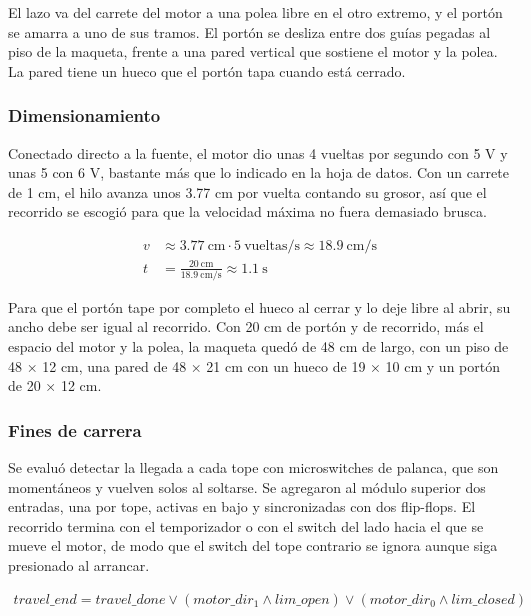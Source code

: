 \documentclass[11pt,letterpaper]{article}
\begin{document}
El lazo va del carrete del motor a una polea libre en el otro extremo, y el portón se amarra a uno de sus tramos. El portón se desliza entre dos guías pegadas al piso de la maqueta, frente a una pared vertical que sostiene el motor y la polea. La pared tiene un hueco que el portón tapa cuando está cerrado.

\subsubsection*{Dimensionamiento}

Conectado directo a la fuente, el motor dio unas 4 vueltas por segundo con 5 V y unas 5 con 6 V, bastante más que lo indicado en la hoja de datos. Con un carrete de 1 cm, el hilo avanza unos 3.77 cm por vuelta contando su grosor, así que el recorrido se escogió para que la velocidad máxima no fuera demasiado brusca.

\begin{align*}
v &\approx 3.77\ \text{cm} \cdot 5\ \text{vueltas/s} \approx 18.9\ \text{cm/s} \\
t &= \frac{20\ \text{cm}}{18.9\ \text{cm/s}} \approx 1.1\ \text{s}
\end{align*}

Para que el portón tape por completo el hueco al cerrar y lo deje libre al abrir, su ancho debe ser igual al recorrido. Con 20 cm de portón y de recorrido, más el espacio del motor y la polea, la maqueta quedó de 48 cm de largo, con un piso de 48 × 12 cm, una pared de 48 × 21 cm con un hueco de 19 × 10 cm y un portón de 20 × 12 cm.

\subsubsection*{Fines de carrera}

Se evaluó detectar la llegada a cada tope con microswitches de palanca, que son momentáneos y vuelven solos al soltarse. Se agregaron al módulo superior dos entradas, una por tope, activas en bajo y sincronizadas con dos flip-flops. El recorrido termina con el temporizador o con el switch del lado hacia el que se mueve el motor, de modo que el switch del tope contrario se ignora aunque siga presionado al arrancar.

\begin{align*}
travel\_end = travel\_done \lor (motor\_dir_1 \land lim\_open) \lor (motor\_dir_0 \land lim\_closed)
\end{align*}
\end{document}
